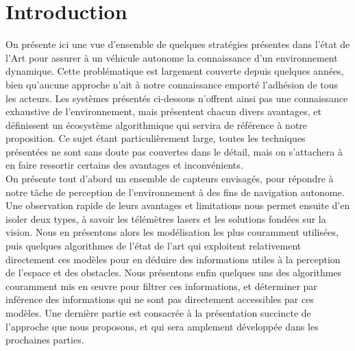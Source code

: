 \vspace{10pt}

\minitoc
\clearpage


\section{Introduction}
On présente ici une vue d'ensemble de quelques stratégies présentes dans l'état de l'Art pour assurer à un véhicule autonome la connaissance d'un environnement dynamique. Cette problématique est largement couverte depuis quelques années, bien qu'aucune approche n'ait à notre connaissance emporté l'adhésion de tous les acteurs. Les systèmes présentés ci-dessous n'offrent ainsi pas une connaissance exhaustive de l'environnement, mais présentent chacun divers avantages, et définissent un écosystème algorithmique qui servira de référence à notre proposition. Ce sujet étant particulièrement large, toutes les techniques présentées ne sont sans doute pas couvertes dans le détail, mais on s'attachera à en faire ressortir certains des avantages et inconvénients.\\

On présente tout d'abord un ensemble de capteurs envisagés, pour répondre à notre tâche de perception de l'environnement à des fins de navigation autonome. Une observation rapide de leurs avantages et limitations nous permet ensuite d'en isoler deux types, à savoir les télémètres lasers et les solutions fondées sur la vision. Nous en présentons alors les modélisation les plus couramment utilisées, puis quelques algorithmes de l'état de l'art qui exploitent relativement directement ces modèles pour en déduire des informations utiles à la perception de l'espace et des obstacles. Nous présentons enfin quelques uns des algorithmes couramment mis en œuvre pour filtrer ces informations, et déterminer par inférence des informations qui ne sont pas directement accessibles par ces modèles. Une dernière partie est consacrée à la présentation succincte de l'approche que nous proposons, et qui sera amplement développée dans les prochaines parties. 

